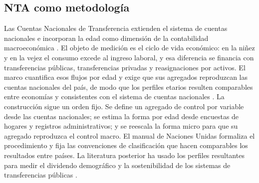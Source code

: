 \documentclass[11pt,a4paper]{article}
\begin{document}
\subsection{NTA como metodología}
Las Cuentas Nacionales de Transferencia extienden el sistema de cuentas nacionales e incorporan
la edad como dimensión de la contabilidad macroeconómica \citep{lee_mason_2011,
un_nta_manual_2013}. El objeto de medición es el ciclo de vida económico: en la niñez y en la
vejez el consumo excede al ingreso laboral, y esa diferencia se financia con transferencias
públicas, transferencias privadas y reasignaciones por activos. El marco cuantifica esos flujos
por edad y exige que sus agregados reproduzcan las cuentas nacionales del país, de modo que los
perfiles etarios resulten comparables entre economías y consistentes con el sistema de cuentas
nacionales \citep{sna_2008}.
La construcción sigue un orden fijo. Se define un agregado de control por variable desde las
cuentas nacionales; se estima la forma por edad desde encuestas de hogares y registros
administrativos; y se reescala la forma micro para que su agregado reproduzca el control macro.
El manual de Naciones Unidas \citep{un_nta_manual_2013} formaliza el procedimiento y fija las
convenciones de clasificación que hacen comparables los resultados entre países. La literatura
posterior ha usado los perfiles resultantes para medir el dividendo demográfico y la
sostenibilidad de los sistemas de transferencias públicas \citep{mason_lee_2007, lee_1994}.
\end{document}
